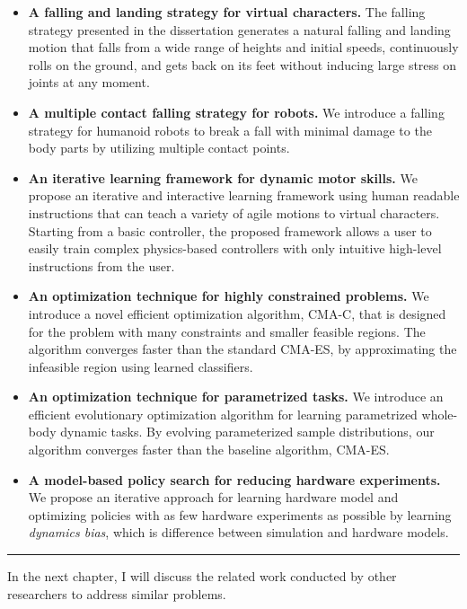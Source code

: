 \begin{itemize}
\item \textbf{A falling and landing strategy for virtual characters.}
  The falling strategy presented in the dissertation generates a natural falling
  and landing motion that falls from a wide range of heights and initial
  speeds, continuously rolls on the ground, and gets back on its feet without
  inducing large stress on joints at any moment.
\item \textbf{A multiple contact falling strategy for robots.}
  We introduce a falling strategy for humanoid robots
  to break a fall with minimal damage to the body parts
  by utilizing multiple contact points.
\item \textbf{An iterative learning framework for dynamic motor skills.}
  We propose an iterative and interactive learning framework 
  using human readable instructions that can teach a variety of agile motions
  to virtual characters.
  Starting from a basic controller, the proposed framework allows a user 
  to easily train complex physics-based controllers 
  with only intuitive high-level instructions from the user.
\item \textbf{An optimization technique for highly constrained problems.}
  We introduce a novel efficient optimization algorithm, CMA-C, that is 
  designed for the problem with many constraints and smaller feasible regions.
  The algorithm converges faster than the standard CMA-ES,
  by approximating the infeasible region using learned classifiers.
\item \textbf{An optimization technique for parametrized tasks.}
  We introduce an efficient evolutionary optimization algorithm for learning
  parametrized whole-body dynamic tasks.
  By evolving parameterized sample distributions, our algorithm
  converges faster than the baseline algorithm, CMA-ES.
\item \textbf{A model-based policy search for reducing hardware experiments.}
  We propose an iterative approach for learning hardware model and optimizing
  policies with as few hardware experiments as possible by learning
  \emph{dynamics bias}, which is difference between simulation and hardware
  models. 
\end{itemize}

\rule{0.95\textwidth}{1pt}

In the next chapter, I will discuss the related work conducted by other
researchers to address similar problems.

